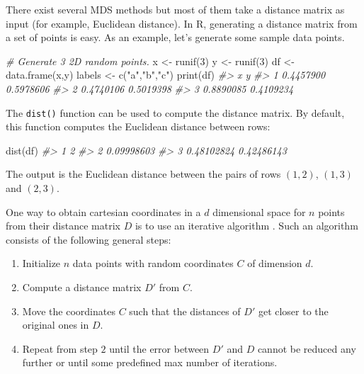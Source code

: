 \documentclass[
  11pt,
]{krantz}
\newenvironment{Shaded}{\begin{snugshade}}{\end{snugshade}}
\newcommand{\CommentTok}[1]{\textcolor[rgb]{0.37,0.37,0.37}{\textit{#1}}}
\newcommand{\DecValTok}[1]{\textcolor[rgb]{0.06,0.06,0.06}{#1}}
\newcommand{\FunctionTok}[1]{\textcolor[rgb]{0,0,0}{#1}}
\newcommand{\NormalTok}[1]{#1}
\newcommand{\OtherTok}[1]{\textcolor[rgb]{0.37,0.37,0.37}{#1}}
\newcommand{\StringTok}[1]{\textcolor[rgb]{0.5,0.5,0.5}{#1}}
\providecommand{\tightlist}{%
  \setlength{\itemsep}{0pt}\setlength{\parskip}{0pt}}
\begin{document}
There exist several MDS methods but most of them take a distance matrix as input (for example, Euclidean distance). In R, generating a distance matrix from a set of points is easy. As an example, let's generate some sample data points.

\begin{Shaded}
\begin{Highlighting}[]
\CommentTok{\# Generate 3 2D random points.}
\NormalTok{x }\OtherTok{\textless{}{-}} \FunctionTok{runif}\NormalTok{(}\DecValTok{3}\NormalTok{)}
\NormalTok{y }\OtherTok{\textless{}{-}} \FunctionTok{runif}\NormalTok{(}\DecValTok{3}\NormalTok{)}
\NormalTok{df }\OtherTok{\textless{}{-}} \FunctionTok{data.frame}\NormalTok{(x,y)}
\NormalTok{labels }\OtherTok{\textless{}{-}} \FunctionTok{c}\NormalTok{(}\StringTok{"a"}\NormalTok{,}\StringTok{"b"}\NormalTok{,}\StringTok{"c"}\NormalTok{)}
\FunctionTok{print}\NormalTok{(df)}
\CommentTok{\#\textgreater{}           x         y}
\CommentTok{\#\textgreater{} 1 0.4457900 0.5978606}
\CommentTok{\#\textgreater{} 2 0.4740106 0.5019398}
\CommentTok{\#\textgreater{} 3 0.8890085 0.4109234}
\end{Highlighting}
\end{Shaded}

The \texttt{dist()} function can be used to compute the distance matrix. By default, this function computes the Euclidean distance between rows:

\begin{Shaded}
\begin{Highlighting}[]
\FunctionTok{dist}\NormalTok{(df)}
\CommentTok{\#\textgreater{}            1          2}
\CommentTok{\#\textgreater{} 2 0.09998603           }
\CommentTok{\#\textgreater{} 3 0.48102824 0.42486143}
\end{Highlighting}
\end{Shaded}

The output is the Euclidean distance between the pairs of rows \((1,2)\), \((1,3)\) and \((2,3)\).

One way to obtain cartesian coordinates in a \(d\) dimensional space for \(n\) points from their distance matrix \(D\) is to use an iterative algorithm \citep{borg2012}. Such an algorithm consists of the following general steps:

\begin{enumerate}
\def\labelenumi{\arabic{enumi}.}
\tightlist
\item
  Initialize \(n\) data points with random coordinates \(C\) of dimension \(d\).
\item
  Compute a distance matrix \(D'\) from \(C\).
\item
  Move the coordinates \(C\) such that the distances of \(D'\) get closer to the original ones in \(D\).
\item
  Repeat from step \(2\) until the error between \(D'\) and \(D\) cannot be reduced any further or until some predefined max number of iterations.
\end{enumerate}
\end{document}
